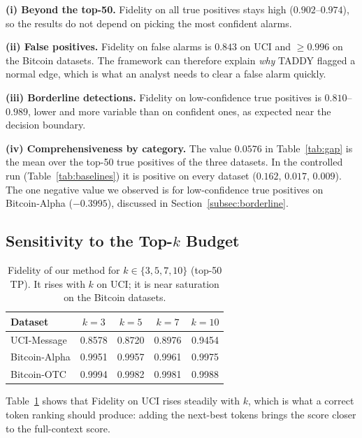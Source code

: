 \documentclass[conference]{IEEEtran}
\begin{document}
\noindent\textbf{(i) Beyond the top-50.} Fidelity on all true positives stays
high ($0.902$--$0.974$), so the results do not depend on picking the most
confident alarms.

\noindent\textbf{(ii) False positives.} Fidelity on false alarms is
$0.843$ on UCI and $\ge0.996$ on the Bitcoin datasets. The framework can
therefore explain \emph{why} TADDY flagged a normal edge, which is what an
analyst needs to clear a false alarm quickly.

\noindent\textbf{(iii) Borderline detections.} Fidelity on low-confidence true
positives is $0.810$--$0.989$, lower and more variable than on confident ones,
as expected near the decision boundary.

\noindent\textbf{(iv) Comprehensiveness by category.} The value $0.0576$ in
Table~\ref{tab:gap} is the mean over the top-50 true positives of the three
datasets. In the controlled run (Table~\ref{tab:baselines}) it is positive on
every dataset ($0.162$, $0.017$, $0.009$). The one negative value we observed is
for low-confidence true positives on Bitcoin-Alpha ($-0.3995$), discussed in
Section~\ref{subsec:borderline}.

\subsection{Sensitivity to the Top-$k$ Budget}

\begin{table}[!t]
\centering
\caption{Fidelity of our method for $k\in\{3,5,7,10\}$ (top-50 TP). It rises
with $k$ on UCI; it is near saturation on the Bitcoin datasets.}
\label{tab:sensitivity}
\footnotesize
\setlength{\tabcolsep}{6pt}
\begin{tabular}{lcccc}
\toprule
\textbf{Dataset} & $k{=}3$ & $k{=}5$ & $k{=}7$ & $k{=}10$ \\
\midrule
UCI-Message    & 0.8578 & 0.8720 & 0.8976 & 0.9454 \\
Bitcoin-Alpha  & 0.9951 & 0.9957 & 0.9961 & 0.9975 \\
Bitcoin-OTC    & 0.9994 & 0.9982 & 0.9981 & 0.9988 \\
\bottomrule
\end{tabular}
\end{table}

Table~\ref{tab:sensitivity} shows that Fidelity on UCI rises steadily with $k$,
which is what a correct token ranking should produce: adding the next-best
tokens brings the score closer to the full-context score.
\end{document}
